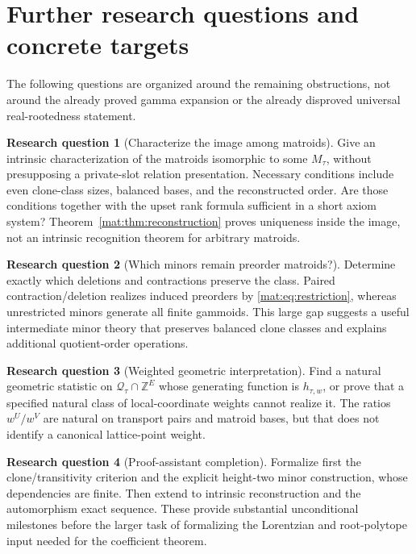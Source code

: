 \documentclass[11pt]{article}
\numberwithin{equation}{section}
\theoremstyle{definition}
\newtheorem{question}{Research question}%
\newcommand{\Z}{\mathbb Z}
\newcommand{\Qt}{\mathcal Q_\tau}
\begin{document}
\section{Further research questions and concrete targets}
\label{mat:sec:questions}
The following questions are organized around the remaining obstructions,
not around the already proved gamma expansion or the already disproved
universal real-rootedness statement.

\begin{question}[Characterize the image among matroids]\label{mat:q:first}
Give an intrinsic characterization of the matroids isomorphic to some
$M_\tau$, without presupposing a private-slot relation presentation.
Necessary conditions include even clone-class sizes, balanced bases, and
the reconstructed order. Are those conditions together with the upset
rank formula sufficient in a short axiom system? Theorem~\ref{mat:thm:reconstruction}
proves uniqueness inside the image, not an intrinsic recognition theorem
for arbitrary matroids.
\end{question}

\begin{question}[Which minors remain preorder matroids?]
Determine exactly which deletions and contractions preserve the class.
Paired contraction/deletion realizes induced preorders by
\eqref{mat:eq:restriction}, whereas unrestricted minors generate all finite
gammoids. This large gap suggests a useful intermediate minor theory that
preserves balanced clone classes and explains additional quotient-order
operations.
\end{question}

\begin{question}[Weighted geometric interpretation]
Find a natural geometric statistic on $\Qt\cap\Z^E$ whose generating
function is $h_{\tau,w}$, or prove that a specified natural class of
local-coordinate weights cannot realize it. The ratios $w^U/w^V$ are
natural on transport pairs and matroid bases, but that does not identify a
canonical lattice-point weight.
\end{question}

\begin{question}[Proof-assistant completion]\label{mat:q:last}
Formalize first the clone/transitivity criterion and the explicit
height-two minor construction, whose dependencies are finite. Then extend
to intrinsic reconstruction and the automorphism exact sequence. These
provide substantial unconditional milestones before the larger task of
formalizing the Lorentzian and root-polytope input needed for the
coefficient theorem.
\end{question}
\end{document}
